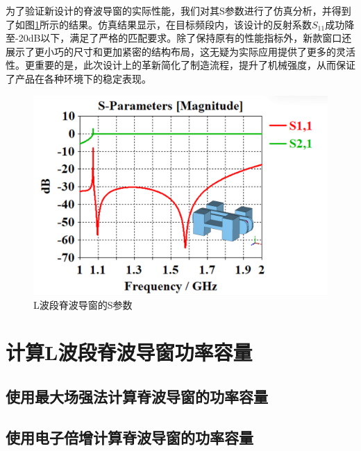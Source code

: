 \documentclass[master]{thesis-uestc}
\begin{document}
为了验证新设计的脊波导窗的实际性能，我们对其S参数进行了仿真分析，并得到了如图\ref{fig:L波段脊波导窗的S参数}所示的结果。仿真结果显示，在目标频段内，该设计的反射系数$S_{11}$成功降至-20dB以下，满足了严格的匹配要求。除了保持原有的性能指标外，新款窗口还展示了更小巧的尺寸和更加紧密的结构布局，这无疑为实际应用提供了更多的灵活性。更重要的是，此次设计上的革新简化了制造流程，提升了机械强度，从而保证了产品在各种环境下的稳定表现。

\begin{figure}[!htb]
    \centering
    \includegraphics[width=0.45\linewidth]{pic/chapter4/L波段脊波导窗S参数.png}
    \caption{L波段脊波导窗的S参数}
    \label{fig:L波段脊波导窗的S参数}
\end{figure}
\section{计算L波段脊波导窗功率容量}
\subsection{使用最大场强法计算脊波导窗的功率容量}
\subsection{使用电子倍增计算脊波导窗的功率容量}
\end{document}
